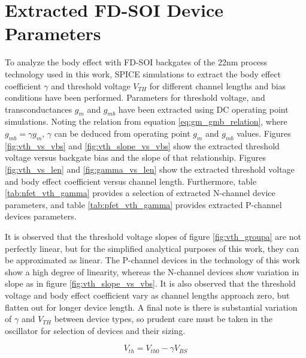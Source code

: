 \section{Extracted FD-SOI Device Parameters}\label{sec:fet_extracted_data}
		To analyze the body effect with FD-SOI backgates of the 22nm process technology used in this work, SPICE simulations to extract the body effect coefficient $\gamma$ and threshold voltage $V_{TH}$ for different channel lengths and bias conditions have been performed. Parameters for threshold voltage, and transconductances $g_m$ and $g_{mb}$ have been extracted using DC operating point simulations. Noting the relation from equation \ref{eq:gm_gmb_relation}, where $g_{mb} = \gamma g_{m}$, $\gamma$ can be deduced from operating point $g_m$ and $g_{mb}$ values. Figures \ref{fig:vth_vs_vbs} and \ref{fig:vth_slope_vs_vbs} show the extracted threshold voltage versus backgate bias and the slope of that relationship. Figures \ref{fig:vth_vs_len} and \ref{fig:gamma_vs_len} show the extracted threshold voltage and body effect coefficient versus channel length. Furthermore, table \ref{tab:nfet_vth_gamma} provides a selection of extracted N-channel device parameters, and table \ref{tab:pfet_vth_gamma} provides extracted P-channel devices parameters.

		It is observed that the threshold voltage slopes of figure \ref{fig:vth_groupa} are not perfectly linear, but for the simplified analytical purposes of this work, they can be approximated as linear. The P-channel devices in the technology of this work show a high degree of linearity, whereas the N-channel devices show variation in slope as in figure \ref{fig:vth_slope_vs_vbs}. It is also observed that the threshold voltage and body effect coefficient vary as channel lengths approach zero, but flatten out for longer device length. A final note is there is substantial variation of $\gamma$ and $V_{TH}$ between device types, so prudent care must be taken in the oscillator for selection of devices and their sizing.

		\begin{equation}
		V_{th} = V_{th0} - \gamma V_{BS}
		\end{equation}

